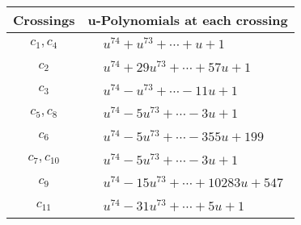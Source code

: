 \documentclass[1p]{elsarticle_modified}
\theoremstyle{definition}
\begin{document}
\begin{tabular}{m{50pt}|m{274pt}}
Crossings & \hspace{64pt}u-Polynomials at each crossing \\
\hline $$\begin{aligned}c_{1},c_{4}\end{aligned}$$&$\begin{aligned}
&u^{74}+u^{73}+\cdots+u+1
\end{aligned}$\\
\hline $$\begin{aligned}c_{2}\end{aligned}$$&$\begin{aligned}
&u^{74}+29 u^{73}+\cdots+57 u+1
\end{aligned}$\\
\hline $$\begin{aligned}c_{3}\end{aligned}$$&$\begin{aligned}
&u^{74}- u^{73}+\cdots-11 u+1
\end{aligned}$\\
\hline $$\begin{aligned}c_{5},c_{8}\end{aligned}$$&$\begin{aligned}
&u^{74}-5 u^{73}+\cdots-3 u+1
\end{aligned}$\\
\hline $$\begin{aligned}c_{6}\end{aligned}$$&$\begin{aligned}
&u^{74}-5 u^{73}+\cdots-355 u+199
\end{aligned}$\\
\hline $$\begin{aligned}c_{7},c_{10}\end{aligned}$$&$\begin{aligned}
&u^{74}-5 u^{73}+\cdots-3 u+1
\end{aligned}$\\
\hline $$\begin{aligned}c_{9}\end{aligned}$$&$\begin{aligned}
&u^{74}-15 u^{73}+\cdots+10283 u+547
\end{aligned}$\\
\hline $$\begin{aligned}c_{11}\end{aligned}$$&$\begin{aligned}
&u^{74}-31 u^{73}+\cdots+5 u+1
\end{aligned}$\\
\hline
\end{tabular}\newpage\renewcommand{\arraystretch}{1}
\end{document}
